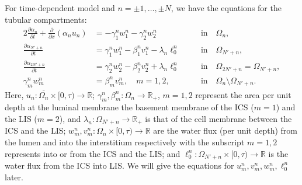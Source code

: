 \documentclass{article}
\begin{document}
For time-dependent model and $n=\pm 1,\dots,\pm N$, we have the equations for the tubular compartments:
\begin{alignat}{2}
    \frac{\partial \alpha_n}{\partial t} + \frac{\partial}{\partial x}(\alpha_nu_n) &= -\gamma_1^nw_{1}^n-\gamma_2^nw_{2}^n\quad \quad \quad \ \ &&\text{in}\quad \Omega_{n},\\
    \frac{\partial \alpha_{N'+n}}{\partial t} &= \gamma_1^nw_{1}^n-\beta_1^nv_1^n-\lambda_n\ell_0^n\quad &&\text{in}\quad \Omega_{N'+n},\\
    \frac{\partial \alpha_{2N'+n}}{\partial t} &= \gamma_2^nw_{2}^n-\beta_2^nv_2^n+\lambda_n\ell_0^n\quad &&\text{in}\quad \Omega_{2N'+n}=\Omega_{N'+n},\\
    \gamma_m^nw_m^n &= \beta_m^nv_m^n,\quad m=1,2,\quad \ &&\text{in}\quad \Omega_n\setminus\Omega_{N'+n}.
\end{alignat}
Here, $u_n:\overline{\Omega_n}\times[0,\tau)\to \mathbb{R}$;
$\gamma_m^n,\beta_m^n:\Omega_n\to \mathbb{R}_+$, $m=1,2$ represent the area per unit depth at the luminal membrane the basement membrane of the ICS ($m=1$) and the LIS ($m=2$), and $\lambda_n:\Omega_{N'+n}\to \mathbb{R}_+$ is that of the cell membrane between the ICS and the LIS;
$w^n_m,v^n_m:\Omega_n\times [0,\tau)\to \mathbb{R}$ are the water flux (per unit depth) from the lumen and into the interstitium respectively with the subscript $m=1,2$ represents into or from the ICS and the LIS; and $\ell_0^n:\Omega_{N'+n}\times [0,\tau)\to \mathbb{R}$ is the water flux from the ICS into LIS.
We will give the equations for $u_m^n,v_m^n,w_m^n,\ell_0^n$ later.
\end{document}
